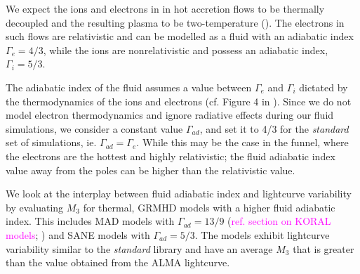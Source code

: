 We expect the ions and electrons in in hot accretion flows to be thermally decoupled and the resulting plasma to be two-temperature (\citealt{1976ApJ...204..187S, Quataert_1998, 10.1093/mnras/stw3116, Ryan_2018}). The electrons in such flows are relativistic and can be modelled as a fluid with an adiabatic index $\Gamma_{e}=4/3$, while the ions are nonrelativistic and possess an adiabatic index, $\Gamma_{i}=5/3$.

The adiabatic index of the fluid assumes a value between $\Gamma_{e}$ and $\Gamma_{i}$ dictated by the thermodynamics of the ions and electrons (cf. Figure 4 in \citealt{10.1093/mnras/stw3116}). Since we do not model electron thermodynamics and ignore radiative effects during our fluid simulations, we consider a constant value $\Gamma_{ad}$, and set it to 4/3 for the \textit{standard} set of simulations, ie. $\Gamma_{ad}=\Gamma_{e}$. While this may be the case in the funnel, where the electrons are the hottest and highly relativistic; the fluid adiabatic index value away from the poles can be higher than the relativistic value.

We look at the interplay between fluid adiabatic index and lightcurve variability by evaluating $M_{3}$ for thermal, GRMHD models with a higher fluid adiabatic index. This includes MAD models with $\Gamma_{ad}=13/9$ (\textcolor{magenta}{ref. section on KORAL models}; \citealt{2021arXiv210812380N}) and SANE models with $\Gamma_{ad}=5/3$. The models exhibit lightcurve variability similar to the \textit{standard} library and have an average $M_{3}$ that is greater than the value obtained from the ALMA lightcurve.
